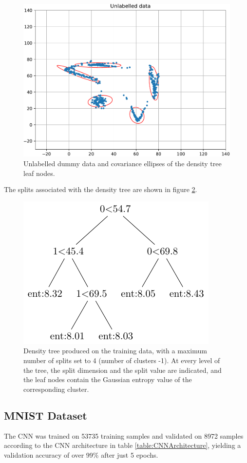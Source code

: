 \documentclass{article}
\begin{document}
\begin{figure}[H]
    \centering
    \includegraphics[width=.7\textwidth]{unlabelled-data-cov.pdf}
    \caption{Unlabelled dummy data and covariance ellipses of the density tree leaf nodes.}
    \label{fig:unlabelled-data-cov}
\end{figure}

The splits associated with the density tree are shown in figure \ref{fig:density-tree}.

\begin{figure}[H]
    \centering
    \includegraphics[width=.45\textwidth]{density-tree.pdf}
    \caption{Density tree produced on the training data, with a maximum number of splits set to 4 (number of clusters -1). At every level of the tree, the split dimension and the split value are indicated, and the leaf nodes contain the Gaussian entropy value of the corresponding cluster.}
    \label{fig:density-tree}
\end{figure}


\subsection{MNIST Dataset}
The CNN was trained on 53735 training samples and validated on 8972 samples according to the CNN architecture in table \ref{table:CNNArchitecture}, yielding a validation accuracy of over 99\% after just 5 epochs.\\
\end{document}
